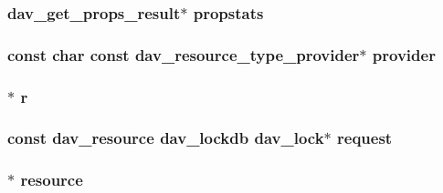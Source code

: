 \subsubsection[{\texorpdfstring{propstats}{propstats}}]{ {\bf dav\+\_\+get\+\_\+props\+\_\+result}$\ast$ propstats}\hypertarget{group__MOD__DAV_ga943fae2396117a775d57830a22f85ddb}{}\label{group__MOD__DAV_ga943fae2396117a775d57830a22f85ddb}
\subsubsection[{\texorpdfstring{provider}{provider}}]{\setlength{\rightskip}{0pt plus 5cm}const char const {\bf dav\+\_\+resource\+\_\+type\+\_\+provider}$\ast$ provider}\hypertarget{group__MOD__DAV_gaf0b2e32aa25087ef77626ce8bb9d7aa4}{}\label{group__MOD__DAV_gaf0b2e32aa25087ef77626ce8bb9d7aa4}
\subsubsection[{\texorpdfstring{r}{r}}]{$\ast$ r}\hypertarget{group__MOD__DAV_gac68e921ed15f71060d618adb662a84f6}{}\label{group__MOD__DAV_gac68e921ed15f71060d618adb662a84f6}
\subsubsection[{\texorpdfstring{request}{request}}]{\setlength{\rightskip}{0pt plus 5cm}const {\bf dav\+\_\+resource} {\bf dav\+\_\+lockdb} {\bf dav\+\_\+lock}$\ast$ request}\hypertarget{group__MOD__DAV_gad8198a9ef18b7a4ce247f8e4b652259a}{}\label{group__MOD__DAV_gad8198a9ef18b7a4ce247f8e4b652259a}
\subsubsection[{\texorpdfstring{resource}{resource}}]{ $\ast$ resource}\hypertarget{group__MOD__DAV_gace5ccd456846e6c0fdd4da4136bd9a44}{}\label{group__MOD__DAV_gace5ccd456846e6c0fdd4da4136bd9a44}
